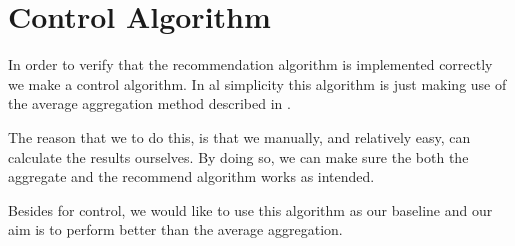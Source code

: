 \section{Control Algorithm} 

In order to verify that the recommendation algorithm is implemented correctly we make a control algorithm. In al simplicity this algorithm is just making use of the average aggregation method described in . 

The reason that we to do this, is that we manually, and relatively easy, can calculate the results ourselves. By doing so, we can make sure the both the aggregate and the recommend algorithm works as intended. 

Besides for control, we would like to use this algorithm as our baseline and our aim is to perform better than the average aggregation.